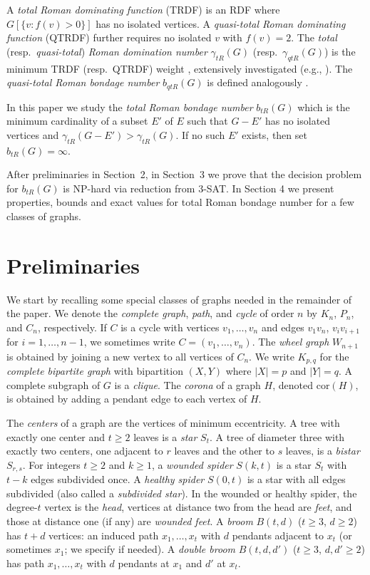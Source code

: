 \documentclass[12pt,reqno]{amsart}
\theoremstyle{plain}
\numberwithin{equation}{section}
\begin{document}
A \textit{total Roman dominating function} (TRDF) is an RDF where $G[\{v:f(v)>0\}]$ has no isolated vertices. A \textit{quasi-total Roman dominating function} (QTRDF) further requires no isolated $v$ with $f(v)=2$. The \textit{total} (resp.\ \textit{quasi-total}) \textit{Roman domination number} $\gamma_{tR}(G)$ (resp.\ $\gamma_{qtR}(G)$) is the minimum TRDF (resp.\ QTRDF) weight \cite{GG,LC}, extensively investigated (e.g., \cite{ah1,MV,Mar}). The \textit{quasi-total Roman bondage number} $b_{qtR}(G)$ is defined analogously \cite{J}.

 In this paper we study the \textit{total Roman bondage number} $b_{tR}(G)$ which is the minimum cardinality of a subset $E'$ of $E$ such that $G-E'$ has no isolated vertices and \linebreak $\gamma_{tR}(G-E')>\gamma_{tR}(G)$. If no such $E'$ exists, then set $b_{tR}(G)=\infty$. 

After preliminaries in  Section~2, in Section~3 we  prove that the decision problem for $b_{tR}(G)$ is NP-hard via reduction from 3-SAT. In Section 4 we present properties, bounds and exact values for total Roman bondage number for a few classes of graphs.

\section{Preliminaries}
We start by recalling some special classes of graphs needed in the remainder of the paper. We denote the \textit{complete graph}, \textit{path}, and \textit{cycle} of order $n$ by $K_n$, $P_n$, and $C_n$, respectively. If $C$ is a cycle with vertices $v_1,\dots,v_n$ and edges $v_1v_n$, $v_iv_{i+1}$ for $i=1,\dots,n-1$, we sometimes write $C=(v_1,\dots,v_n)$. The \textit{wheel graph} $W_{n+1}$ is obtained by joining a new vertex to all vertices of $C_n$. We write $K_{p,q}$ for the \textit{complete bipartite graph} with bipartition $(X,Y)$ where $|X|=p$ and $|Y|=q$. A complete subgraph of $G$ is a \textit{clique}. The \textit{corona} of a graph $H$, denoted $\mathrm{cor}(H)$, is obtained by adding a pendant edge to each vertex of $H$.

The \textit{centers} of a graph are the vertices of minimum eccentricity. A tree with exactly one center and $t\geq 2$ leaves is a \textit{star} $S_t$. A tree of diameter three with exactly two centers, one adjacent to $r$ leaves and the other to $s$ leaves, is a \textit{bistar} $S_{r,s}$. For integers $t\geq 2$ and $k\geq 1$, a \textit{wounded spider} $S(k,t)$ is a star $S_t$ with $t-k$ edges subdivided once. A \textit{healthy spider} $S(0,t)$ is a star with all edges subdivided (also called a \textit{subdivided star}). In the wounded or healthy spider, the degree-$t$ vertex is the \textit{head}, vertices at distance two from the head are \textit{feet}, and those at distance one (if any) are \textit{wounded feet}. A \textit{broom} $B(t,d)$ ($t\geq 3$, $d\geq 2$) has $t+d$ vertices: an induced path $x_1,\dots,x_t$ with $d$ pendants adjacent to $x_t$ (or sometimes $x_1$; we specify if needed). A \textit{double broom} $B(t,d,d')$ ($t\geq 3$, $d,d'\geq 2$) has path $x_1,\dots,x_t$ with $d$ pendants at $x_1$ and $d'$ at $x_t$.
\end{document}
